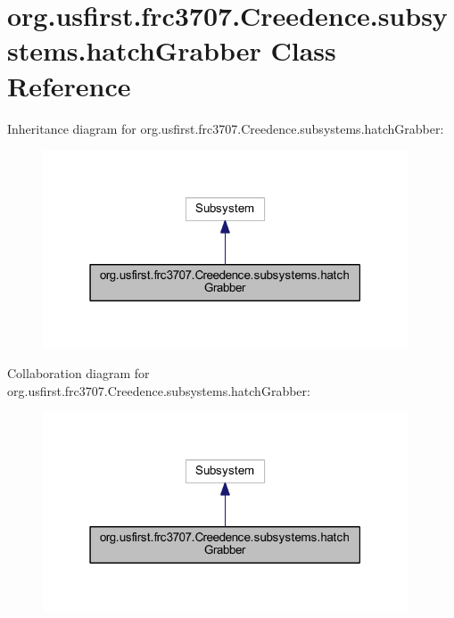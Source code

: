 \hypertarget{classorg_1_1usfirst_1_1frc3707_1_1_creedence_1_1subsystems_1_1hatch_grabber}{}\section{org.\+usfirst.\+frc3707.\+Creedence.\+subsystems.\+hatch\+Grabber Class Reference}
\label{classorg_1_1usfirst_1_1frc3707_1_1_creedence_1_1subsystems_1_1hatch_grabber}


Inheritance diagram for org.\+usfirst.\+frc3707.\+Creedence.\+subsystems.\+hatch\+Grabber\+:
\nopagebreak
\begin{figure}[H]
\begin{center}
\leavevmode
\includegraphics[width=307pt]{classorg_1_1usfirst_1_1frc3707_1_1_creedence_1_1subsystems_1_1hatch_grabber__inherit__graph}
\end{center}
\end{figure}


Collaboration diagram for org.\+usfirst.\+frc3707.\+Creedence.\+subsystems.\+hatch\+Grabber\+:
\nopagebreak
\begin{figure}[H]
\begin{center}
\leavevmode
\includegraphics[width=307pt]{classorg_1_1usfirst_1_1frc3707_1_1_creedence_1_1subsystems_1_1hatch_grabber__coll__graph}
\end{center}
\end{figure}

